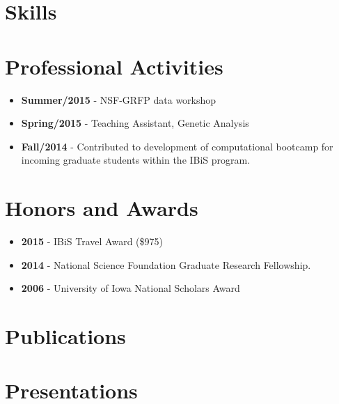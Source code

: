 \documentclass[11pt,a4paper,sans]{moderncv}
\begin{document}
\section{Skills}

\section{Professional Activities}
\begin{itemize}%
\item \textbf{Summer/2015} - NSF-GRFP data workshop
\item \textbf{Spring/2015} - Teaching Assistant, Genetic Analysis
\item \textbf{Fall/2014} - Contributed to development of computational bootcamp for incoming graduate students within the IBiS program.
\end{itemize}

\section{Honors and Awards}
\begin{itemize}%
\item \textbf{2015} - IBiS Travel Award (\$975)
\item \textbf{2014} - National Science Foundation Graduate Research Fellowship. 
\item \textbf{2006} - University of Iowa National Scholars Award
\end{itemize}


\newpage
\section{Publications}

\nocite{*}


\printbibliography[type=article,heading=none]
\newpage
\section{Presentations}
\begin{refsection}
\nocite{*}
\printbibliography[type=presentation,heading=none]
\end{refsection}
\end{document}
